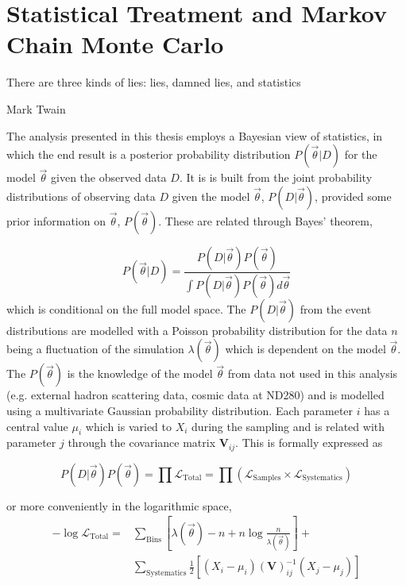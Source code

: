 \chapter{Statistical Treatment and Markov Chain Monte Carlo}
\label{chap:mcmc}

\epigraph{There are three kinds of lies: lies, damned lies, and statistics}{Mark Twain}

The analysis presented in this thesis employs a Bayesian view of statistics, in which the end result is a posterior probability distribution $P(\vec{\theta}|D)$ for the model $\vec{\theta}$ given the observed data $D$. It is is built from the joint probability distributions of observing data $D$ given the model $\vec{\theta}$, $P(D|\vec{\theta})$, provided some prior information on $\vec{\theta}$, $P(\vec{\theta})$. These are related through Bayes' theorem,

\begin{equation}
P(\vec{\theta}|D) = \frac{P(D|\vec{\theta})P(\vec{\theta})}{\int P(D|\vec{\theta})P(\vec{\theta})d\vec{\theta}}
\label{eq:bayes}
\end{equation}
which is conditional on the full model space. The $P(D|\vec{\theta})$ from the event distributions are modelled with a Poisson probability distribution for the data $n$ being a fluctuation of the simulation $\lambda(\vec{\theta})$ which is dependent on the model $\vec{\theta}$. The $P(\vec{\theta})$ is the knowledge of the model $\vec{\theta}$ from data not used in this analysis (e.g. external hadron scattering data, cosmic data at ND280) and is modelled using a multivariate Gaussian probability distribution. Each parameter $i$ has a central value $\mu_i$ which is varied to $X_i$ during the sampling and is related with parameter $j$ through the covariance matrix $\mathbf{V}_{ij}$. This is formally expressed as

\begin{equation}
	P(D|\vec{\theta}) P(\vec{\theta}) = \prod \mathcal{L}_\text{Total} = \prod \left(\mathcal{L}_\text{Samples} \times \mathcal{L}_\text{Systematics}\right)
\end{equation}

or more conveniently in the logarithmic space,
\begin{equation}
\label{eq:test_stat}
\begin{split}
	- \log\mathcal{L}_\text{Total} = &\sum_\text{Bins} \left[ \lambda(\vec{\theta}) - n + n \log \frac{n}{\lambda(\vec{\theta})} \right] + \\
									& \sum_\text{Systematics} \frac{1}{2} \left[ ( X_i - \mu_i ) \left( \boldsymbol{V} \right)^{-1}_{ij} ( X_j - \mu_j ) \right]
\end{split}
\end{equation}

